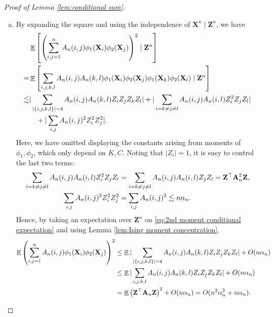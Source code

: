 \documentclass[preprint,reqno]{imsart}
\newcommand{\an}{\alpha_{\mathnormal n}}
\DeclareMathOperator{\EE}{\mathbb{E}}
\newcommand{\A}{\mathbf{A}}
\newcommand{\Z}{\mathbf{Z}}
\newcommand{\X}{\mathbf{X}}
\DeclareMathOperator{\sumij}{\sum_{\mathnormal{ i,j}=1}^{\mathnormal n}}
\begin{document}
\begin{appendix}
\begin{proof}[Proof of Lemma \ref{lem:conditional sum}]
\begin{enumerate}[(a)]
    \item By expanding the square and using the independence of $\X^n \mid \Z^n$, we have
    \begin{equation}\label{eq:2nd moment conditional expectation}
    \begin{aligned}
        &\EE \left[ \left( \sumij A_n(i,j) \phi_1(\X_i) \phi_2(\X_j) \right)^2 \mid \Z^n \right] \\
        =&  \EE \left[ \sum_{i,j,k,l} A_n(i,j) A_n(k,l) \phi_1(\X_i) \phi_2(\X_j) \phi_1(\X_k) \phi_2(\X_l) \mid \Z^n \right]  \\
        \lesssim& |\sum_{|\{i,j,k,l\}|=4} A_n(i,j) A_n(k,l) Z_i Z_j Z_k Z_l| + |\sum_{i=k \neq j \neq l} A_n(i,j) A_n(i,l) Z_i^2 Z_j Z_l| \\
        & \quad + |\sum_{i, j} A_n(i,j)^2 Z_i^2 Z_j^2|.
    \end{aligned}
    \end{equation}
    Here, we have omitted displaying the constants arising from moments of $\phi_1, \phi_2$, which only depend on $K, C$.
    Noting that $|Z_i| = 1$, it is easy to control the last two terms:
    \begin{align*}
        \sum_{i=k \neq j \neq l} A_n(i,j) A_n(i,l) Z_i^2 Z_j Z_l &= \sum_{i=k \neq j \neq l} A_n(i,j) A_n(i,l) Z_j Z_l = \Z^\top \A_n^2 \Z, \\
        \sum_{i, j} A_n(i,j)^2 Z_i^2 Z_j^2 &= \sum_{i, j} A_n(i,j)^2 \lesssim n\an.
    \end{align*}
    Hence, by taking an expectation over $\Z^n$ on \eqref{eq:2nd moment conditional expectation} and using Lemma \ref{lem:Ising moment concentration},
    \begin{align*}
        \EE \left( \sumij A_n(i,j) \phi_1(\X_i) \phi_2(\X_j) \right)^2 &\le \EE |\sum_{|\{i,j,k,l\}|=4} A_n(i,j) A_n(k,l) Z_i Z_j Z_k Z_l| + O(n\an) \\
        &\le \EE |\sum_{i,j,k,l} A_n(i,j) A_n(k,l) Z_i Z_j Z_k Z_l| + O(n\an) \\
        &= \EE \left(\Z^\top \A_n \Z \right)^2 + O(n\an) = O(n^2 \alpha_n^2 + n\an).
    \end{align*}
    \end{enumerate}
    \end{proof} %

%


\end{appendix}
\end{document}
